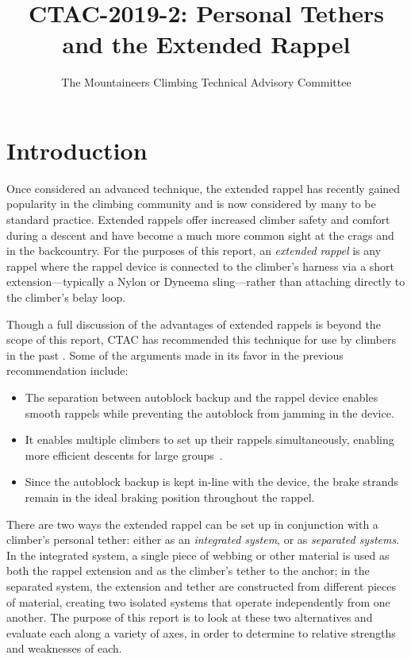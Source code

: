 \documentclass[nonacm,acmtog]{acmart}
\title{CTAC-2019-2: Personal Tethers and the Extended Rappel}
\subtitle{The Mountaineers Climbing Technical Advisory Committee}
\begin{document}
\maketitle


\section{Introduction}
\label{sec:intro}

   Once considered an advanced technique, the extended rappel has recently
   gained popularity in the climbing community and is now considered by many to
   be standard practice.  Extended rappels offer increased climber safety and
   comfort during a descent and have become a much more common sight at the
   crags and in the backcountry.  For the purposes of this report, an {\it
   extended rappel} is any rappel where the rappel device is connected to the
   climber's harness via a short extension---typically a Nylon or Dyneema
   sling---rather than attaching directly to the climber's belay loop.

   Though a full discussion of the advantages of extended rappels is beyond the
   scope of this report, CTAC has recommended this technique for use by
   climbers in the past \cite{mtnrs-rappel-blog1}.  Some of the arguments made
   in its favor in the previous recommendation include:

   \begin{itemize}
      \item The separation between autoblock backup and the rappel device
      enables smooth rappels while preventing the autoblock from jamming in the
      device.

      \item It enables multiple climbers to set up their rappels
      simultaneously, enabling more efficient descents for large
      groups~\cite{ctac:2019-3}.

      \item Since the autoblock backup is kept in-line with the device, the
      brake strands remain in the ideal braking position throughout the rappel.
   \end{itemize}

   There are two ways the extended rappel can be set up in conjunction with
   a climber's personal tether: either as an {\it integrated system}, or as
   {\it separated systems}.  In the integrated system, a single piece of
   webbing or other material is used as both the rappel extension and as the
   climber's tether to the anchor; in the separated system, the extension and
   tether are constructed from different pieces of material, creating two
   isolated systems that operate independently from one another.  The purpose
   of this report is to look at these two alternatives and evaluate each along
   a variety of axes, in order to determine to relative strengths and
   weaknesses of each.
\end{document}
